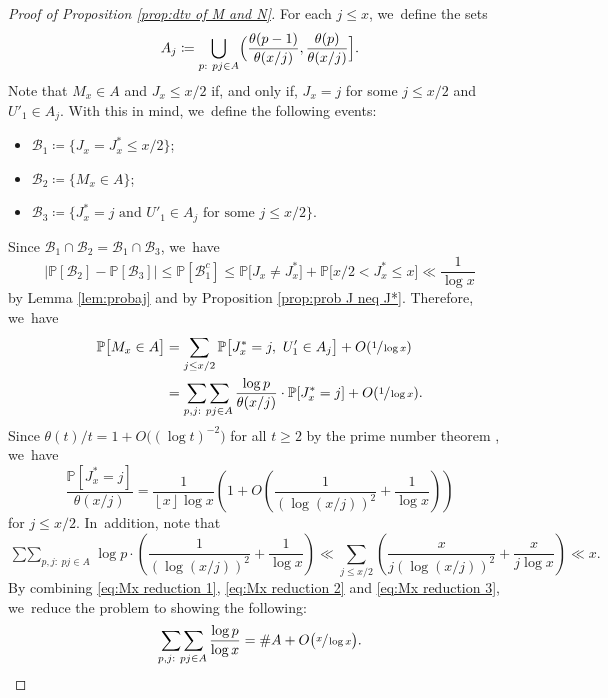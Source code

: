 \documentclass[10pt,a4paper]{amsart}
\newcommand{\bigO}[1]{O(#1)}
\newcommand{\PP}{\mathbb{P}}
\newcommand{\BC}{\mathcal{B}}
\newcommand{\bigoo}[1]{O\!\left(#1 \right)}
\newcommand{\floor}[1]{\left\lfloor #1 \right\rfloor}
\newcommand{\bg}{\big}
\newcommand{\bgg}{\Big}
\theoremstyle{plain}
\theoremstyle{definition}
\begin{document}
\begin{proof}[Proof of Proposition \ref{prop:dtv of M and N}]
For each $j \le x$, we~define the sets
\[
A_j \coloneqq \bigcup_{\substack{p:\ pj \in A}} \Bigl(\frac{\theta(p-1)}{\theta(x/j)}, \frac{\theta(p)}{\theta(x/j)}\Bigr].
\]
Note that $M_x \in A$ and $J_x \le x/2$ if, and only if, $J_x=j$ for some $j\le x/2$ and $U'_1 \in A_j$. With this in mind, we~define the following events:
\begin{itemize}
\item $\mathcal B_1 \coloneqq \{J_x=J_x^* \le x/2\}$;
\item $\mathcal B_2 \coloneqq \{ M_x \in A\}$;
\item $\mathcal B_3 \coloneqq \{\mbox{$J_x^* = j$ and $U'_1 \in A_j$ for some $j\le x/2$}\}$.
\end{itemize}
Since $\mathcal B_1 \cap \mathcal B_2 = \mathcal B_1 \cap \mathcal B_3$, we~have
\[
\bgg|\PP[\BC_2] - \PP[\BC_3]\bgg| \le \PP[\BC_1^c] \le \PP\bg[J_x \ne J_x^*\bg] + \PP\bg[x/2< J_x^* \le x\bg] \ll \frac{1}{\log x}
\]
by Lemma \ref{lem:probaj} and by Proposition \ref{prop:prob J neq J*}. Therefore, we~have
\begin{equation}
\label{eq:Mx reduction 1}
\begin{aligned}
\PP\bg[M_x \in A\bg]
&= \sum_{j \le x/2} \PP\bg[J_x^* = j,\ U'_1 \in A_j\bg] + \bigO{\sfrac{1}{\log x}} \\
&= \mathop{\sum\sum}_{p,j:\ pj \in A} \frac{\log p}{\theta(x/j)}\cdot \PP[J_x^* = j] + \bigO{\sfrac{1}{\log x}}.
\end{aligned}
\end{equation}
Since $\theta(t)/t = 1 + O\bg((\log t)^{-2}\bg)$ for all $t \ge 2$ by the prime number theorem \cite[Th.\,8.1]{Koukoulo19}, we~have
\begin{equation}
\label{eq:Mx reduction 2}
\frac{\PP[J_x^* = j]}{\theta(x/j)} = \frac{1}{\floor x \log x}\left(1+\bigoo{\frac{1}{(\log(x/j))^2}+\frac{1}{\log x}}\right)
\end{equation}
for $j\le x/2$. In~addition, note that
\begin{equation}
\label{eq:Mx reduction 3}
\mathop{\sum\sum}_{p,j:\ pj \in A} \log p \cdot \left(\frac{1}{(\log(x/j))^2} + \frac{1}{\log x}\right) \ll \sum_{j \le x/2} \left(\frac{x}{j(\log(x/j))^2} + \frac{x}{j\log x}\right) \ll x.
\end{equation}
By combining \eqref{eq:Mx reduction 1}, \eqref{eq:Mx reduction 2} and \eqref{eq:Mx reduction 3}, we~reduce the problem to showing the following:
\begin{equation}
\label{eq:Mx reduction 4}
\mathop{\sum\sum}_{p,j:\ pj \in A} \frac{\log p}{\log x} = \# A + O\bg(\sfrac{x}{\log x}\bg).

\end{equation}
\end{proof}
\end{document}
